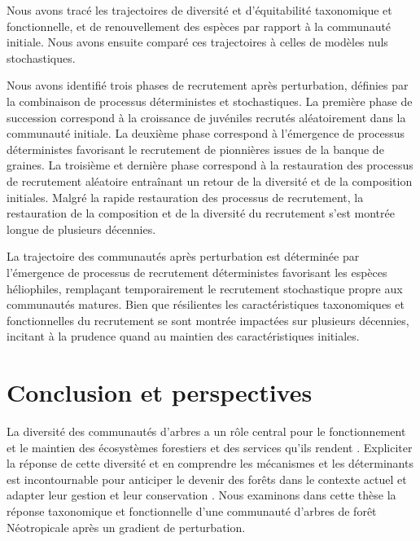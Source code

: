\documentclass[
  11pt,
  french,
  A4paper,
  extrafontsizes,onecolumn,openright
  ]{memoir}
\begin{document}
Nous avons tracé les trajectoires de diversité et d'équitabilité
taxonomique et fonctionnelle, et de renouvellement des espèces par
rapport à la communauté initiale. Nous avons ensuite comparé ces
trajectoires à celles de modèles nuls stochastiques.

Nous avons identifié trois phases de recrutement après perturbation,
définies par la combinaison de processus déterministes et stochastiques.
La première phase de succession correspond à la croissance de juvéniles
recrutés aléatoirement dans la communauté initiale. La deuxième phase
correspond à l'émergence de processus déterministes favorisant le
recrutement de pionnières issues de la banque de graines. La troisième
et dernière phase correspond à la restauration des processus de
recrutement aléatoire entraînant un retour de la diversité et de la
composition initiales. Malgré la rapide restauration des processus de
recrutement, la restauration de la composition et de la diversité du
recrutement s'est montrée longue de plusieurs décennies.

La trajectoire des communautés après perturbation est déterminée par
l'émergence de processus de recrutement déterministes favorisant les
espèces héliophiles, remplaçant temporairement le recrutement
stochastique propre aux communautés matures. Bien que résilientes les
caractéristiques taxonomiques et fonctionnelles du recrutement se sont
montrée impactées sur plusieurs décennies, incitant à la prudence quand
au maintien des caractéristiques initiales.

\chapter{Conclusion et perspectives}\label{conclusion-et-perspectives}

La diversité des communautés d'arbres a un rôle central pour le
fonctionnement et le maintien des écosystèmes forestiers et des services
qu'ils rendent \autocite{Tilman2014}. Expliciter la réponse de cette
diversité et en comprendre les mécanismes et les déterminants est
incontournable pour anticiper le devenir des forêts dans le contexte
actuel et adapter leur gestion et leur conservation
\autocite{Barlow2018}. Nous examinons dans cette thèse la réponse
taxonomique et fonctionnelle d'une communauté d'arbres de forêt
Néotropicale après un gradient de perturbation.
\end{document}
